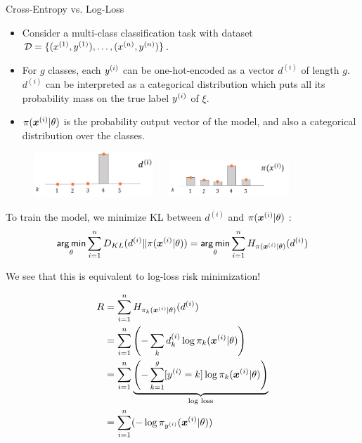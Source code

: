 \begin{vbframe}{Cross-Entropy vs. Log-Loss}

  \begin{itemize}
    \item Consider a multi-class classification task with dataset $\mathcal{D} = \{ (x^{(1)}, y^{(1)}), \ldots, (x^{(n)}, y^{(n)})\}$.
    \item For $g$ classes, each $y^{(i)}$ can be one-hot-encoded as a vector $d^{(i)}$ of length $g$. $d^{(i)}$ can be interpreted as a categorical distribution which puts all its probability mass on the true label $y^{(i)}$ of $\xi$.
    \item $\pi(\bm{x}^{(i)}|\theta)$ is the probability output vector of the model, and also a categorical distribution over the classes.

  \end{itemize}
\lz
\begin{figure}
\includegraphics[width=0.4\textwidth]{figure_man/multinoulli.png}
~~
\includegraphics[width=0.4\textwidth]{figure_man/multiclass-predictive.png}
\end{figure}
    \framebreak

    
To train the model, we minimize KL between $d^{(i)}$ and $\pi(\bm{x}^{(i)}|\theta)$ :
$$ \mathop{\sf arg\,min}_{\theta} \sum_{i=1}^n D_{KL} (d^{(i)} \| \pi(\bm{x}^{(i)}|\theta)) = \mathop{\sf arg\,min}_{\theta} \sum_{i=1}^n  H_{\pi(\bm{x}^{(i)}|\theta)}(d^{(i)}) $$
  
We see that this is equivalent to log-loss risk minimization!
  \begin{footnotesize}
    \begin{equation*}
      \begin{split}
               R &= \sum_{i=1}^n  H_{\pi_k(\bm{x}^{(i)}|\theta)}(d^{(i)}) \\
                 &= \sum_{i=1}^n \left( - \sum_k d^{(i)}_k \log\pi_k(\bm{x}^{(i)}|\theta) \right) \\
                 & = \sum_{i=1}^n \underbrace{ \left( -\sum_{k = 1}^g [y^{(i)} = k]\log \pi_{k}(\bm{x}^{(i)}|\theta) \right) }_{\text{log loss}} \\
                 & = \sum_{i=1}^n (-\log\pi_{y^{(i)}}(\bm{x}^{(i)}|\theta)) 
      \end{split}
    \end{equation*}
  \end{footnotesize}
\end{vbframe}

